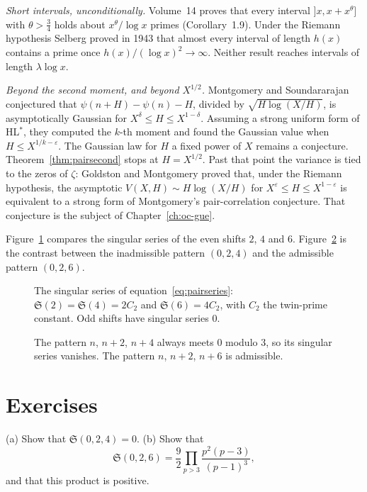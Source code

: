 \emph{Short intervals, unconditionally.} Volume~14 proves that every interval $]x,x+x^\theta]$ with $\theta>\frac34$ holds about $x^\theta/\log x$ primes (Corollary~1.9). Under the Riemann hypothesis Selberg proved in 1943 that almost every interval of length $h(x)$ contains a prime once $h(x)/(\log x)^2\to\infty$. Neither result reaches intervals of length $\lambda\log x$.

\emph{Beyond the second moment, and beyond $X^{1/2}$.} Montgomery and Soundararajan conjectured that $\psi(n+H)-\psi(n)-H$, divided by $\sqrt{H\log(X/H)}$, is asymptotically Gaussian for $X^\delta\le H\le X^{1-\delta}$. Assuming a strong uniform form of HL$^*$, they computed the $k$-th moment and found the Gaussian value when $H\le X^{1/k-\varepsilon}$. The Gaussian law for $H$ a fixed power of $X$ remains a conjecture. Theorem~\ref{thm:pairsecond} stops at $H=X^{1/2}$. Past that point the variance is tied to the zeros of $\zeta$: Goldston and Montgomery proved that, under the Riemann hypothesis, the asymptotic $V(X,H)\sim H\log(X/H)$ for $X^\varepsilon\le H\le X^{1-\varepsilon}$ is equivalent to a strong form of Montgomery's pair-correlation conjecture. That conjecture is the subject of Chapter~\ref{ch:oc-gue}.

Figure~\ref{fig:v15c05-series} compares the singular series of the even shifts \(2\), \(4\) and \(6\). Figure~\ref{fig:v15c05-patterns} is the contrast between the inadmissible pattern \((0,2,4)\) and the admissible pattern \((0,2,6)\).

\begin{figure}[ht]
\centering
{}
\caption{The singular series of equation~\eqref{eq:pairseries}: \(\mathfrak S(2)=\mathfrak S(4)=2C_2\) and \(\mathfrak S(6)=4C_2\), with \(C_2\) the twin-prime constant. Odd shifts have singular series \(0\).}
\label{fig:v15c05-series}
\end{figure}

\begin{figure}[ht]
\centering
{}
\caption{The pattern \(n\), \(n+2\), \(n+4\) always meets \(0\) modulo \(3\), so its singular series vanishes. The pattern \(n\), \(n+2\), \(n+6\) is admissible.}
\label{fig:v15c05-patterns}
\end{figure}

\section{Exercises}

\begin{exercise}[$\star$]\label{ex:triples}
(a) Show that $\mathfrak S(0,2,4)=0$. (b) Show that
\[
\mathfrak S(0,2,6)=\frac92\prod_{p>3}\frac{p^2(p-3)}{(p-1)^3},
\]
and that this product is positive.
\end{exercise}

